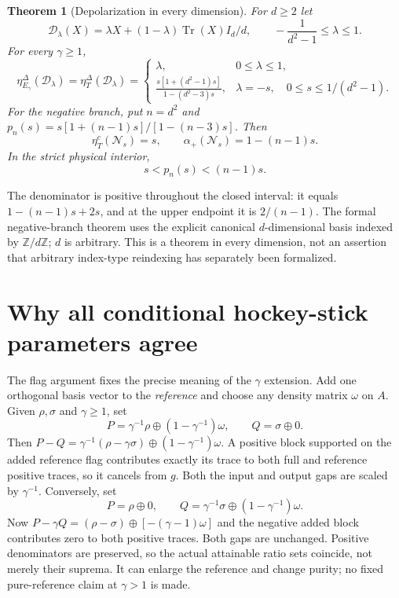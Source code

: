 \documentclass[11pt,a4paper]{article}
\newtheorem{theorem}{Theorem}
\newcommand{\Tr}{\operatorname{Tr}}
\newcommand{\cN}{\mathcal N}
\newcommand{\etal}{\eta^{\Delta}_{E_\gamma}}
\newcommand{\etatr}{\eta^{\Delta}_T}
\newcommand{\etac}{\eta^{c}_T}
\begin{document}
\begin{theorem}[Depolarization in every dimension]\label{thm:depol}
For $d\ge2$ let
\[
 \mathcal D_\lambda(X)=\lambda X+(1-\lambda)\Tr(X)I_d/d,
 \qquad -\frac1{d^2-1}\le\lambda\le1.
\]
For every $\gamma\ge1$,
\begin{equation}\label{eq:full-depol}
 \etal(\mathcal D_\lambda)=\etatr(\mathcal D_\lambda)=
 \begin{cases}
 \lambda,&0\le\lambda\le1,\\[2mm]
 \displaystyle\frac{s[1+(d^2-1)s]}{1-(d^2-3)s},
 &\lambda=-s,\quad0\le s\le1/(d^2-1).
 \end{cases}
\end{equation}
For the negative branch, put $n=d^2$ and $p_n(s)=s[1+(n-1)s]/[1-(n-3)s]$. Then
\[
 \etac(\cN_s)=s,\qquad \alpha_+(\cN_s)=1-(n-1)s.
\]
In the strict physical interior,
\[
 s<p_n(s)<(n-1)s.
\]
\end{theorem}

The denominator is positive throughout the closed interval: it equals
$1-(n-1)s+2s$, and at the upper endpoint it is $2/(n-1)$. The formal negative-branch theorem uses the explicit canonical $d$-dimensional basis indexed by $\mathbb Z/d\mathbb Z$; $d$ is arbitrary. This is a theorem in every dimension, not an assertion that arbitrary index-type reindexing has separately been formalized.

\section{Why all conditional hockey-stick parameters agree}\label{sec:gamma}
The flag argument fixes the precise meaning of the $\gamma$ extension. Add one orthogonal basis vector to the \emph{reference} and choose any density matrix $\omega$ on $A$. Given $\rho,\sigma$ and $\gamma\ge1$, set
\[
 P=\gamma^{-1}\rho\oplus(1-\gamma^{-1})\omega,
 \qquad Q=\sigma\oplus0.
\]
Then $P-Q=\gamma^{-1}(\rho-\gamma\sigma)\oplus(1-\gamma^{-1})\omega$. A positive block supported on the added reference flag contributes exactly its trace to both full and reference positive traces, so it cancels from $g$. Both the input and output gaps are scaled by $\gamma^{-1}$. Conversely, set
\[
 P=\rho\oplus0,\qquad
 Q=\gamma^{-1}\sigma\oplus(1-\gamma^{-1})\omega.
\]
Now $P-\gamma Q=(\rho-\sigma)\oplus[-(\gamma-1)\omega]$ and the negative added block contributes zero to both positive traces. Both gaps are unchanged. Positive denominators are preserved, so the actual attainable ratio sets coincide, not merely their suprema. It can enlarge the reference and change purity; no fixed pure-reference claim at $\gamma>1$ is made.
\end{document}
